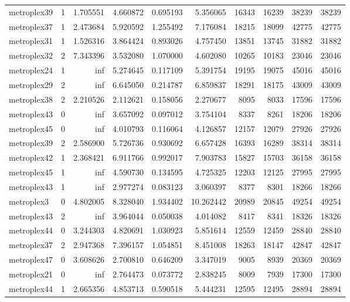 \begin{longtable}{|l|r|r|r|r|r|r|r|r|r|}
metroplex39 & 1 & 1.705551 & 4.660872 & 0.695193 & 5.356065 & 16343 & 16239 & 38239 & 38239 \\
metroplex37 & 1 & 2.473684 & 5.920592 & 1.255492 & 7.176084 & 18215 & 18099 & 42775 & 42775 \\
metroplex31 & 1 & 1.526316 & 3.864424 & 0.893026 & 4.757450 & 13851 & 13745 & 31882 & 31882 \\
metroplex32 & 2 & 7.343396 & 3.532080 & 1.070000 & 4.602080 & 10265 & 10183 & 23046 & 23046 \\
metroplex24 & 1 & inf & 5.274645 & 0.117109 & 5.391754 & 19195 & 19075 & 45016 & 45016 \\
metroplex29 & 2 & inf & 6.645050 & 0.214787 & 6.859837 & 18291 & 18175 & 43009 & 43009 \\
metroplex38 & 2 & 2.210526 & 2.112621 & 0.158056 & 2.270677 & 8095 & 8033 & 17596 & 17596 \\
metroplex43 & 0 & inf & 3.657092 & 0.097012 & 3.754104 & 8337 & 8261 & 18206 & 18206 \\
metroplex45 & 0 & inf & 4.010793 & 0.116064 & 4.126857 & 12157 & 12079 & 27926 & 27926 \\
metroplex39 & 2 & 2.586900 & 5.726736 & 0.930692 & 6.657428 & 16393 & 16289 & 38314 & 38314 \\
metroplex42 & 1 & 2.368421 & 6.911766 & 0.992017 & 7.903783 & 15827 & 15703 & 36158 & 36158 \\
metroplex45 & 1 & inf & 4.590730 & 0.134595 & 4.725325 & 12203 & 12125 & 27995 & 27995 \\
metroplex43 & 1 & inf & 2.977274 & 0.083123 & 3.060397 & 8377 & 8301 & 18266 & 18266 \\
metroplex3 & 0 & 4.802005 & 8.328040 & 1.934402 & 10.262442 & 20989 & 20845 & 49254 & 49254 \\
metroplex43 & 2 & inf & 3.964044 & 0.050038 & 4.014082 & 8417 & 8341 & 18326 & 18326 \\
metroplex44 & 0 & 3.244303 & 4.820691 & 1.030923 & 5.851614 & 12559 & 12459 & 28840 & 28840 \\
metroplex37 & 2 & 2.947368 & 7.396157 & 1.054851 & 8.451008 & 18263 & 18147 & 42847 & 42847 \\
metroplex47 & 0 & 3.608626 & 2.700810 & 0.646209 & 3.347019 & 9005 & 8939 & 20369 & 20369 \\
metroplex21 & 0 & inf & 2.764473 & 0.073772 & 2.838245 & 8009 & 7939 & 17300 & 17300 \\
metroplex44 & 1 & 2.665356 & 4.853713 & 0.590518 & 5.444231 & 12595 & 12495 & 28894 & 28894 \\

\end{longtable}
